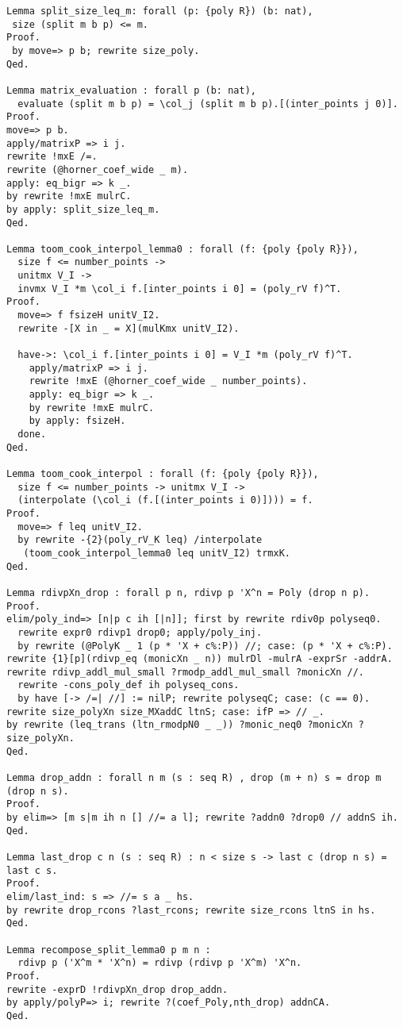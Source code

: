 \begin{lstlisting}
Lemma split_size_leq_m: forall (p: {poly R}) (b: nat),
 size (split m b p) <= m.
Proof.
 by move=> p b; rewrite size_poly.
Qed.

Lemma matrix_evaluation : forall p (b: nat),
  evaluate (split m b p) = \col_j (split m b p).[(inter_points j 0)].
Proof.
move=> p b.
apply/matrixP => i j.
rewrite !mxE /=.
rewrite (@horner_coef_wide _ m).
apply: eq_bigr => k _.
by rewrite !mxE mulrC.
by apply: split_size_leq_m.
Qed.

Lemma toom_cook_interpol_lemma0 : forall (f: {poly {poly R}}),
  size f <= number_points ->
  unitmx V_I ->
  invmx V_I *m \col_i f.[inter_points i 0] = (poly_rV f)^T.
Proof.
  move=> f fsizeH unitV_I2.
  rewrite -[X in _ = X](mulKmx unitV_I2).

  have->: \col_i f.[inter_points i 0] = V_I *m (poly_rV f)^T.
    apply/matrixP => i j.
    rewrite !mxE (@horner_coef_wide _ number_points).
    apply: eq_bigr => k _.
    by rewrite !mxE mulrC.
    by apply: fsizeH.
  done.
Qed.

Lemma toom_cook_interpol : forall (f: {poly {poly R}}),
  size f <= number_points -> unitmx V_I ->
  (interpolate (\col_i (f.[(inter_points i 0)]))) = f.
Proof.
  move=> f leq unitV_I2.
  by rewrite -{2}(poly_rV_K leq) /interpolate 
   (toom_cook_interpol_lemma0 leq unitV_I2) trmxK.
Qed.

Lemma rdivpXn_drop : forall p n, rdivp p 'X^n = Poly (drop n p).
Proof.
elim/poly_ind=> [n|p c ih [|n]]; first by rewrite rdiv0p polyseq0.
  rewrite expr0 rdivp1 drop0; apply/poly_inj.
  by rewrite (@PolyK _ 1 (p * 'X + c%:P)) //; case: (p * 'X + c%:P).
rewrite {1}[p](rdivp_eq (monicXn _ n)) mulrDl -mulrA -exprSr -addrA.
rewrite rdivp_addl_mul_small ?rmodp_addl_mul_small ?monicXn //.
  rewrite -cons_poly_def ih polyseq_cons.
  by have [-> /=| //] := nilP; rewrite polyseqC; case: (c == 0).
rewrite size_polyXn size_MXaddC ltnS; case: ifP => // _.
by rewrite (leq_trans (ltn_rmodpN0 _ _)) ?monic_neq0 ?monicXn ?size_polyXn.
Qed.

Lemma drop_addn : forall n m (s : seq R) , drop (m + n) s = drop m (drop n s).
Proof.
by elim=> [m s|m ih n [] //= a l]; rewrite ?addn0 ?drop0 // addnS ih.
Qed.

Lemma last_drop c n (s : seq R) : n < size s -> last c (drop n s) = last c s.
Proof.
elim/last_ind: s => //= s a _ hs.
by rewrite drop_rcons ?last_rcons; rewrite size_rcons ltnS in hs.
Qed.

Lemma recompose_split_lemma0 p m n :
  rdivp p ('X^m * 'X^n) = rdivp (rdivp p 'X^m) 'X^n.
Proof.
rewrite -exprD !rdivpXn_drop drop_addn.
by apply/polyP=> i; rewrite ?(coef_Poly,nth_drop) addnCA.
Qed.


\end{lstlisting}

